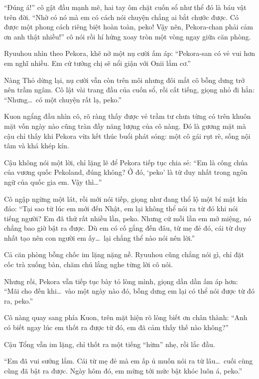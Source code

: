 \documentclass[../main.tex]{subfiles}
\begin{document}
``Đúng á!'' cô gật đầu mạnh mẽ, hai tay ôm chặt cuốn sổ như thể đó là báu vật trên đời. ``Nhờ có nó mà em có cách nói chuyện chẳng ai bắt chước được. Có được một phong cách riêng biệt hoàn toàn, peko! Vậy nên, Pekora-chan phải cảm ơn anh thật nhiều!'' cô nói rồi hí hửng xoay tròn một vòng ngay giữa căn phòng.

Ryuuhou nhìn theo Pekora, khẽ nở một nụ cười ấm áp: ``Pekora-san có vẻ vui hơn em nghĩ nhiều. Em cứ tưởng chị sẽ nổi giận với Onii lắm cơ.''

Nàng Thỏ dừng lại, nụ cười vẫn còn trên môi nhưng đôi mắt cô bỗng dưng trở nên trầm ngâm. Cô lật vài trang đầu của cuốn sổ, rồi cất tiếng, giọng nhỏ đi hẳn: ``Nhưng\dots\ có một chuyện rất lạ, peko.''

Kuon ngẩng đầu nhìn cô, rõ ràng thấy được vẻ trầm tư chưa từng có trên khuôn mặt vốn ngày nào cũng tràn đầy năng lượng của cô nàng. Đó là gương mặt mà cậu chỉ thấy khi Pekora vừa kết thúc buổi phát sóng: một cô gái rụt rè, sống nội tâm và khá khép kín.

Cậu không nói một lời, chỉ lặng lẽ để Pekora tiếp tục chia sẻ: ``Em là công chúa của vương quốc Pekoland, đúng không? Ở đó, `peko' là từ duy nhất trong ngôn ngữ của quốc gia em. Vậy thì\dots''

Cô ngập ngừng một lát, rồi mới nói tiếp, giọng như đang thổ lộ một bí mật kín đáo: ``Tại sao từ lúc em mới đến Nhật, em lại không thể nói ra từ đó khi nói tiếng người? Em đã thử rất nhiều lần, peko. Nhưng cứ mỗi lần em mở miệng, nó chẳng bao giờ bật ra được. Dù em có cố gắng đến đâu, từ mẹ đẻ đó, cái từ duy nhất tạo nên con người em ấy\dots\ lại chẳng thể nào nói nên lời.''

Cả căn phòng bỗng chốc im lặng nặng nề. Ryuuhou cũng chẳng nói gì, chỉ đặt cốc trà xuống bàn, chăm chú lắng nghe từng lời cô nói.

Nhưng rồi, Pekora vẫn tiếp tục bày tỏ lòng mình, giọng dần dần ấm áp hơn: ``Mãi cho đến khi\dots\ vào một ngày nào đó, bỗng dưng em lại có thể nói được từ đó ra, peko.''

Cô nàng quay sang phía Kuon, trên mặt hiện rõ lòng biết ơn chân thành: ``Anh có biết ngay lúc em thốt ra được từ đó, em đã cảm thấy thế nào không?''

Cậu Tổng vẫn im lặng, chỉ thốt ra một tiếng ``hừm'' nhẹ, rồi lắc đầu.

``Em đã vui sướng lắm. Cái từ mẹ đẻ mà em ấp ủ muốn nói ra từ lâu\dots\ cuối cùng cũng đã bật ra được. Ngày hôm đó, em mừng tới mức bật khóc luôn á, peko.''
\end{document}
